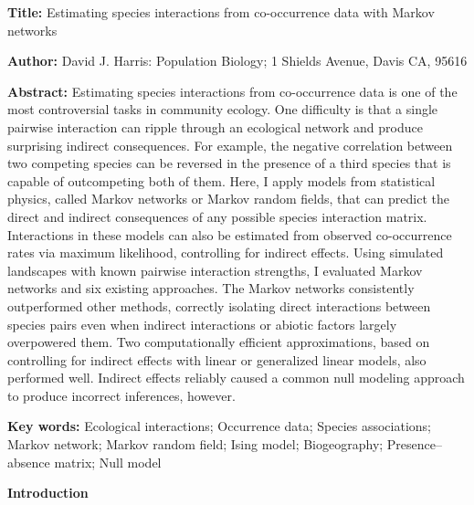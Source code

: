 \documentclass[12pt,]{article}
\date{}
\begin{document}
\begin{spacing}{1.9}
\begin{flushleft}
\renewcommand{\headrulewidth}{0pt}

\setlength{\parskip}{1pt}

\textbf{Title:} Estimating species interactions from co-occurrence data
with Markov networks

\textbf{Author:} David J. Harris: Population Biology; 1 Shields Avenue,
Davis CA, 95616

\textbf{Abstract:} Estimating species interactions from co-occurrence
data is one of the most controversial tasks in community ecology. One
difficulty is that a single pairwise interaction can ripple through an
ecological network and produce surprising indirect consequences. For
example, the negative correlation between two competing species can be
reversed in the presence of a third species that is capable of
outcompeting both of them. Here, I apply models from statistical
physics, called Markov networks or Markov random fields, that can
predict the direct and indirect consequences of any possible species
interaction matrix. Interactions in these models can also be estimated
from observed co-occurrence rates via maximum likelihood, controlling
for indirect effects. Using simulated landscapes with known pairwise
interaction strengths, I evaluated Markov networks and six existing
approaches. The Markov networks consistently outperformed other methods,
correctly isolating direct interactions between species pairs even when
indirect interactions or abiotic factors largely overpowered them. Two
computationally efficient approximations, based on controlling for
indirect effects with linear or generalized linear models, also
performed well. Indirect effects reliably caused a common null modeling
approach to produce incorrect inferences, however.

\textbf{Key words:} Ecological interactions; Occurrence data; Species
associations; Markov network; Markov random field; Ising model;
Biogeography; Presence--absence matrix; Null model

\noindent\textbf{Introduction}

\setlength{\parindent}{2em}


\end{flushleft}
\end{spacing}
\end{document}
